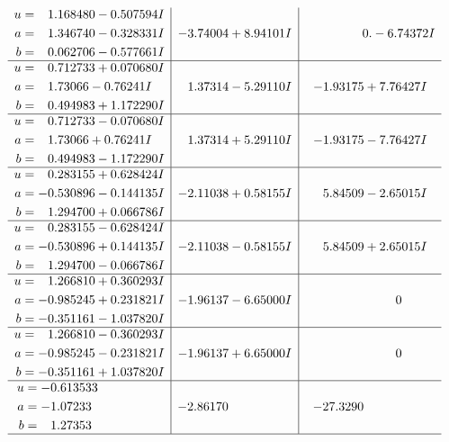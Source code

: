 \documentclass[1p]{elsarticle_modified}
\theoremstyle{definition}
\begin{document}
$$\begin{array}{c|c|c}
\begin{aligned}
u &= \phantom{-}1.168480 - 0.507594 I \\
a &= \phantom{-}1.346740 - 0.328331 I \\
b &= \phantom{-}0.062706 - 0.577661 I\end{aligned}
 & -3.74004 + 8.94101 I & \phantom{-0.000000 } 0. - 6.74372 I \\ \hline\begin{aligned}
u &= \phantom{-}0.712733 + 0.070680 I \\
a &= \phantom{-}1.73066 - 0.76241 I \\
b &= \phantom{-}0.494983 + 1.172290 I\end{aligned}
 & \phantom{-}1.37314 - 5.29110 I & -1.93175 + 7.76427 I \\ \hline\begin{aligned}
u &= \phantom{-}0.712733 - 0.070680 I \\
a &= \phantom{-}1.73066 + 0.76241 I \\
b &= \phantom{-}0.494983 - 1.172290 I\end{aligned}
 & \phantom{-}1.37314 + 5.29110 I & -1.93175 - 7.76427 I \\ \hline\begin{aligned}
u &= \phantom{-}0.283155 + 0.628424 I \\
a &= -0.530896 - 0.144135 I \\
b &= \phantom{-}1.294700 + 0.066786 I\end{aligned}
 & -2.11038 + 0.58155 I & \phantom{-}5.84509 - 2.65015 I \\ \hline\begin{aligned}
u &= \phantom{-}0.283155 - 0.628424 I \\
a &= -0.530896 + 0.144135 I \\
b &= \phantom{-}1.294700 - 0.066786 I\end{aligned}
 & -2.11038 - 0.58155 I & \phantom{-}5.84509 + 2.65015 I \\ \hline\begin{aligned}
u &= \phantom{-}1.266810 + 0.360293 I \\
a &= -0.985245 + 0.231821 I \\
b &= -0.351161 - 1.037820 I\end{aligned}
 & -1.96137 - 6.65000 I & \phantom{-0.000000 } 0 \\ \hline\begin{aligned}
u &= \phantom{-}1.266810 - 0.360293 I \\
a &= -0.985245 - 0.231821 I \\
b &= -0.351161 + 1.037820 I\end{aligned}
 & -1.96137 + 6.65000 I & \phantom{-0.000000 } 0 \\ \hline\begin{aligned}
u &= -0.613533\phantom{ +0.000000I} \\
a &= -1.07233\phantom{ +0.000000I} \\
b &= \phantom{-}1.27353\phantom{ +0.000000I}\end{aligned}
 & -2.86170\phantom{ +0.000000I} & -27.3290\phantom{ +0.000000I}\\
 \hline 
 \end{array}$$\newpage
\end{document}
